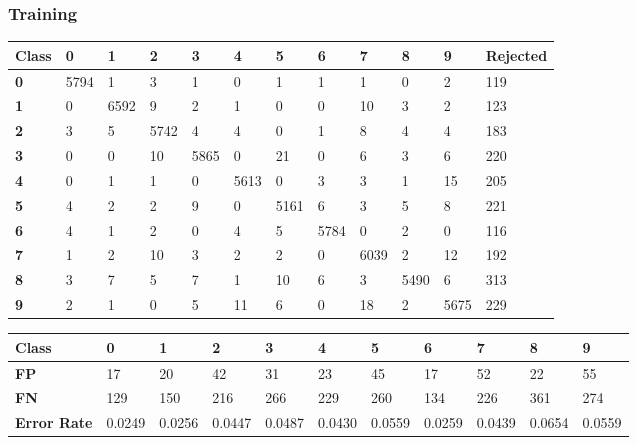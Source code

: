 \documentclass[
  a4paper,            %
  DIV=10,             %
  oneside,            %
  BCOR=5mm,           %
  parskip=half,       %
  numbers=noenddot,   %
  bibtotoc,           %
  listof=totoc,        %
  article
]{scrreprt}
\begin{document}
\subsubsection{Training}
\begin{center}
  \centering
  \begin{tabular}{|p{1cm}|p{1cm}|p{1cm}|p{1cm}|p{1cm}|p{1cm}|p{1cm}|p{1cm}|p{1cm}|p{1cm}|p{1cm}|p{1.7cm}|}
    \hline
    \textbf{Class} & \textbf{0} & \textbf{1} & \textbf{2} & \textbf{3} & \textbf{4} & \textbf{5} & \textbf{6} & \textbf{7} & \textbf{8} & \textbf{9} & \textbf{Rejected} \\
    \hline
    \textbf{0} & 5794 & 1 & 3 & 1 & 0 & 1 & 1 & 1 & 0 & 2 & 119 \\
    \hline
    \textbf{1} & 0 & 6592 & 9 & 2 & 1 & 0 & 0 & 10 & 3 & 2 & 123 \\
    \hline
    \textbf{2} & 3 & 5 & 5742 & 4 & 4 & 0 & 1 & 8 & 4 & 4 & 183 \\
    \hline
    \textbf{3} & 0 & 0 & 10 & 5865 & 0 & 21 & 0 & 6 & 3 & 6 & 220 \\
    \hline
    \textbf{4} & 0 & 1 & 1 & 0 & 5613 & 0 & 3 & 3 & 1 & 15 & 205 \\
    \hline
    \textbf{5} & 4 & 2 & 2 & 9 & 0 & 5161 & 6 & 3 & 5 & 8 & 221 \\
    \hline
    \textbf{6} & 4 & 1 & 2 & 0 & 4 & 5 & 5784 & 0 & 2 & 0 & 116 \\
    \hline
    \textbf{7} & 1 & 2 & 10 & 3 & 2 & 2 & 0 & 6039 & 2 & 12 & 192 \\
    \hline
    \textbf{8} & 3 & 7 & 5 & 7 & 1 & 10 & 6 & 3 & 5490 & 6 & 313 \\
    \hline
    \textbf{9} & 2 & 1 & 0 & 5 & 11 & 6 & 0 & 18 & 2 & 5675 & 229 \\
    \hline
  \end{tabular}
\end{center}

\begin{center}
  \begin{tabular}{|p{1cm}|p{1cm}|p{1cm}|p{1cm}|p{1cm}|p{1cm}|p{1cm}|p{1cm}|p{1cm}|p{1cm}|p{1cm}|}
    \hline
    \textbf{Class} & \textbf{0} & \textbf{1} & \textbf{2} & \textbf{3} & \textbf{4} & \textbf{5} & \textbf{6} & \textbf{7} & \textbf{8} & \textbf{9} \\
    \hline
    \textbf{FP} & 17 & 20 & 42 & 31 & 23 & 45 & 17 & 52 & 22 & 55 \\
    \hline
    \textbf{FN} & 129 & 150 & 216 & 266 & 229 & 260 & 134 & 226 & 361 & 274 \\
    \hline
    \textbf{Error Rate} & 0.0249 & 0.0256 & 0.0447 & 0.0487 & 0.0430 & 0.0559 & 0.0259 & 0.0439 & 0.0654 & 0.0559 \\
    \hline
  \end{tabular}
\end{center}
\end{document}
